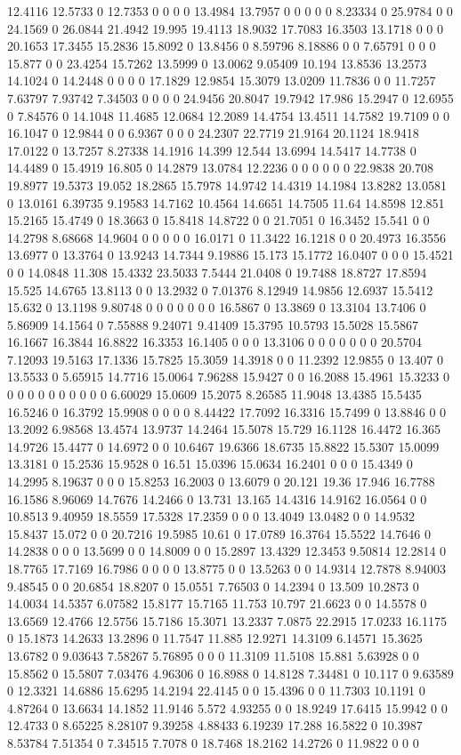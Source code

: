 12.4116 12.5733 0 12.7353 0 0 0 0 13.4984 13.7957 0 0 0 0 0 8.23334 0 25.9784 0 0 24.1569 0 26.0844 21.4942 19.995 19.4113 18.9032 17.7083 16.3503 13.1718 0 0 0 20.1653 17.3455 15.2836 15.8092 0 13.8456 0 8.59796 8.18886 0 0 7.65791 0 0 0 15.877 0 0 23.4254 15.7262 13.5999 0 13.0062 9.05409 10.194 13.8536 13.2573 14.1024 0 14.2448 0 0 0 0 17.1829 12.9854 15.3079 13.0209 11.7836 0 0 11.7257 7.63797 7.93742 7.34503 0 0 0 0 24.9456 20.8047 19.7942 17.986 15.2947 0 12.6955 0 7.84576 0 14.1048 11.4685 12.0684 12.2089 14.4754 13.4511 14.7582 19.7109 0 0 16.1047 0 12.9844 0 0 6.9367 0 0 0 24.2307 22.7719 21.9164 20.1124 18.9418 17.0122 0 13.7257 8.27338 14.1916 14.399 12.544 13.6994 14.5417 14.7738 0 14.4489 0 15.4919 16.805 0 14.2879 13.0784 12.2236 0 0 0 0 0 0 22.9838 20.708 19.8977 19.5373 19.052 18.2865 15.7978 14.9742 14.4319 14.1984 13.8282 13.0581 0 13.0161 6.39735 9.19583 14.7162 10.4564 14.6651 14.7505 11.64 14.8598 12.851 15.2165 15.4749 0 18.3663 0 15.8418 14.8722 0 0 21.7051 0 16.3452 15.541 0 0 14.2798 8.68668 14.9604 0 0 0 0 0 16.0171 0 11.3422 16.1218 0 0 20.4973 16.3556 13.6977 0 13.3764 0 13.9243 14.7344 9.19886 15.173 15.1772 16.0407 0 0 0 15.4521 0 0 14.0848 11.308 15.4332 23.5033 7.5444 21.0408 0 19.7488 18.8727 17.8594 15.525 14.6765 13.8113 0 0 13.2932 0 7.01376 8.12949 14.9856 12.6937 15.5412 15.632 0 13.1198 9.80748 0 0 0 0 0 0 0 16.5867 0 13.3869 0 13.3104 13.7406 0 5.86909 14.1564 0 7.55888 9.24071 9.41409 15.3795 10.5793 15.5028 15.5867 16.1667 16.3844 16.8822 16.3353 16.1405 0 0 0 13.3106 0 0 0 0 0 0 0 20.5704 7.12093 19.5163 17.1336 15.7825 15.3059 14.3918 0 0 11.2392 12.9855 0 13.407 0 13.5533 0 5.65915 14.7716 15.0064 7.96288 15.9427 0 0 16.2088 15.4961 15.3233 0 0 0 0 0 0 0 0 0 0 0 6.60029 15.0609 15.2075 8.26585 11.9048 13.4385 15.5435 16.5246 0 16.3792 15.9908 0 0 0 0 8.44422 17.7092 16.3316 15.7499 0 13.8846 0 0 13.2092 6.98568 13.4574 13.9737 14.2464 15.5078 15.729 16.1128 16.4472 16.365 14.9726 15.4477 0 14.6972 0 0 10.6467 19.6366 18.6735 15.8822 15.5307 15.0099 13.3181 0 15.2536 15.9528 0 16.51 15.0396 15.0634 16.2401 0 0 0 15.4349 0 14.2995 8.19637 0 0 0 15.8253 16.2003 0 13.6079 0 20.121 19.36 17.946 16.7788 16.1586 8.96069 14.7676 14.2466 0 13.731 13.165 14.4316 14.9162 16.0564 0 0 10.8513 9.40959 18.5559 17.5328 17.2359 0 0 0 13.4049 13.0482 0 0 14.9532 15.8437 15.072 0 0 20.7216 19.5985 10.61 0 17.0789 16.3764 15.5522 14.7646 0 14.2838 0 0 0 13.5699 0 0 14.8009 0 0 15.2897 13.4329 12.3453 9.50814 12.2814 0 18.7765 17.7169 16.7986 0 0 0 0 13.8775 0 0 13.5263 0 0 14.9314 12.7878 8.94003 9.48545 0 0 20.6854 18.8207 0 15.0551 7.76503 0 14.2394 0 13.509 10.2873 0 14.0034 14.5357 6.07582 15.8177 15.7165 11.753 10.797 21.6623 0 0 14.5578 0 13.6569 12.4766 12.5756 15.7186 15.3071 13.2337 7.0875 22.2915 17.0233 16.1175 0 15.1873 14.2633 13.2896 0 11.7547 11.885 12.9271 14.3109 6.14571 15.3625 13.6782 0 9.03643 7.58267 5.76895 0 0 0 11.3109 11.5108 15.881 5.63928 0 0 15.8562 0 15.5807 7.03476 4.96306 0 16.8988 0 14.8128 7.34481 0 10.117 0 9.63589 0 12.3321 14.6886 15.6295 14.2194 22.4145 0 0 15.4396 0 0 11.7303 10.1191 0 4.87264 0 13.6634 14.1852 11.9146 5.572 4.93255 0 0 18.9249 17.6415 15.9942 0 0 12.4733 0 8.65225 8.28107 9.39258 4.88433 6.19239 17.288 16.5822 0 10.3987 8.53784 7.51354 0 7.34515 7.7078 0 18.7468 18.2162 14.2726 0 11.9822 0 0 0 